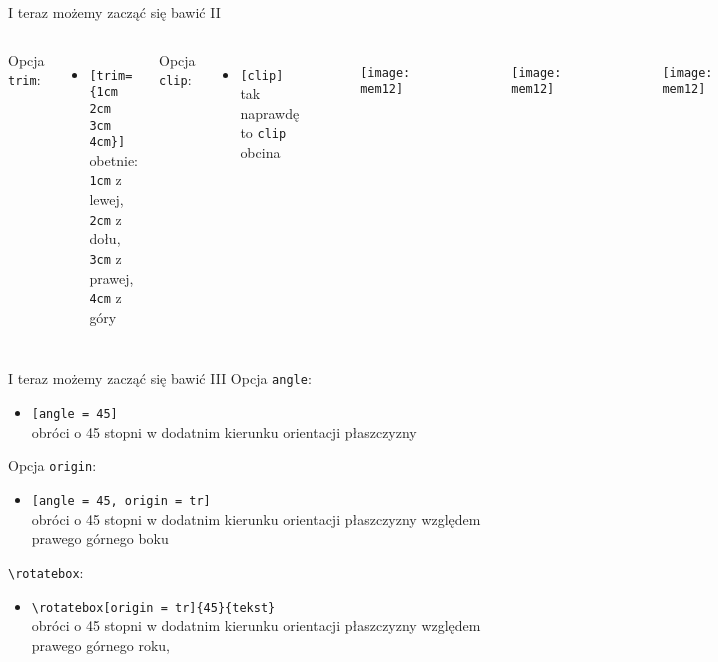 \documentclass{beamer}
\newcommand{\tb}{\textbackslash}
\begin{document}
\begin{frame}{I teraz możemy zacząć się bawić II}{}
\begin{columns}
    Opcja \texttt{trim}:
    \begin{itemize}%
        \item \texttt{[trim= \{1cm 2cm 3cm 4cm\}]}\\
        obetnie:
        \texttt{1cm} z lewej,
        \texttt{2cm} z dołu,
        \texttt{3cm} z prawej,
        \texttt{4cm} z góry
    \end{itemize}\pause
    Opcja \texttt{clip}:
    \begin{itemize}%
        \item \texttt{[clip]}\\
        tak naprawdę to \texttt{clip} obcina
    \end{itemize} 


    \begin{figure}
        \centering
        \texttt{[image: mem12]}
    \end{figure}
    \begin{figure}
        \centering
        \texttt{[image: mem12]}
    \end{figure}
    \begin{figure}
        \centering
        \texttt{[image: mem12]}
    \end{figure}

    \end{columns} 
\end{frame}

\begin{frame}{I teraz możemy zacząć się bawić III}{}
    Opcja \texttt{angle}:
    \begin{itemize}
        \item \texttt{[angle = 45]}\\
        obróci o 45 stopni w dodatnim kierunku orientacji płaszczyzny
    \end{itemize}\pause
    Opcja \texttt{origin}:
    \begin{itemize}
        \item \texttt{[angle = 45, origin = tr]}\\
        obróci o 45 stopni w dodatnim kierunku orientacji płaszczyzny względem prawego górnego boku
    \end{itemize}\pause
    \texttt{\tb{rotatebox}}:
    \begin{itemize}
        \item \texttt{\tb{}rotatebox[origin = tr]\{45\}\{tekst\}}\\
        obróci o 45 stopni w dodatnim kierunku orientacji płaszczyzny względem prawego górnego roku, 
    \end{itemize}
    
\end{frame}
\end{document}

